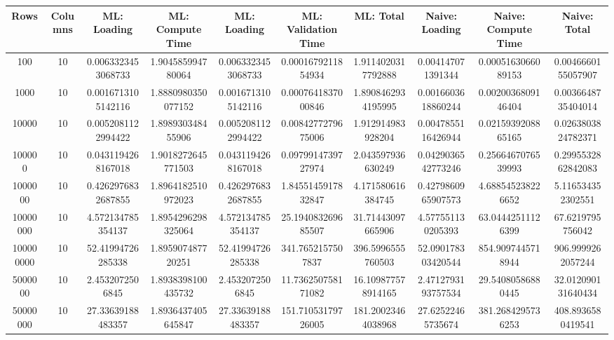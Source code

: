 \begin{table}[htb]
    \centering
    \begin{tabular}{@{}cccccccccc@{}}
        \toprule
        Rows & Columns & ML: Loading & ML: Compute Time & ML: Loading & ML: Validation Time & ML: Total & Naive: Loading & Naive: Compute Time & Naive: Total \\
        \midrule
        100 & 10 & 0.0063323453068733 & 1.904585994780064 & 0.0063323453068733 & 0.0001679211854934 & 1.9114020317792888 & 0.004147071391344 & 0.0005163066089153 & 0.0046660155057907 \\
        1000 & 10 & 0.0016713105142116 & 1.8880980350077152 & 0.0016713105142116 & 0.0007641837000846 & 1.8908462934195995 & 0.0016603618860244 & 0.0020036809146404 & 0.0036648735404014 \\
        10000 & 10 & 0.0052081122994422 & 1.898930348455906 & 0.0052081122994422 & 0.0084277279675006 & 1.912914983928204 & 0.0047855116426944 & 0.0215939208865165 & 0.0263803824782371 \\
        100000 & 10 & 0.0431194268167018 & 1.9018272645771503 & 0.0431194268167018 & 0.0979914739727974 & 2.043597936630249 & 0.0429036542773246 & 0.2566467076539993 & 0.2995532862842083 \\
        1000000 & 10 & 0.4262976832687855 & 1.8964182510972023 & 0.4262976832687855 & 1.8455145917832847 & 4.171580616384745 & 0.4279860965907573 & 4.688545238226652 & 5.116534352302551 \\
        10000000 & 10 & 4.572134785354137 & 1.8954296298325064 & 4.572134785354137 & 25.194083269685507 & 31.71443097665906 & 4.577551130205393 & 63.04442511126399 & 67.6219795756042 \\
        100000000 & 10 & 52.41994726285338 & 1.895907487720251 & 52.41994726285338 & 341.7652157507837 & 396.5996555760503 & 52.090178303420544 & 854.9097445718944 & 906.9999262057244 \\
        5000000 & 10 & 2.4532072506845 & 1.8938398100435732 & 2.4532072506845 & 11.736250758171082 & 16.109877578914165 & 2.4712793193757534 & 29.54080586880445 & 32.012090131640434 \\
        50000000 & 10 & 27.33639188483357 & 1.8936437405645847 & 27.33639188483357 & 151.71053179726005 & 181.20023464038968 & 27.62522465735674 & 381.2684295736253 & 408.8936580419541 \\
        \bottomrule
    \end{tabular}
\end{table}